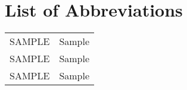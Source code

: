 \chapter{List of Abbreviations}

{\sffamily

{\renewcommand{\arraystretch}{1.2}
\begin{tabular}{r|l}
SAMPLE & Sample\\
SAMPLE & Sample\\
SAMPLE & Sample\\
\end{tabular}}



	
}